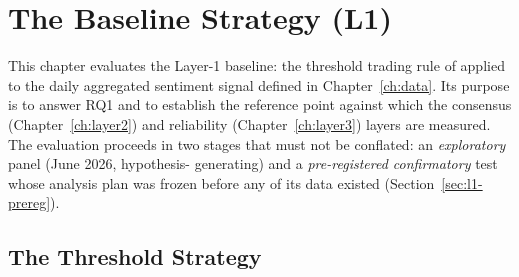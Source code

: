 %
%
%
%
\chapter{The Baseline Strategy (L1)}
\label{ch:layer1}

This chapter evaluates the Layer-1 baseline: the threshold trading rule
of \textcite{mitic2026llm} applied to the daily aggregated sentiment
signal defined in Chapter~\ref{ch:data}. Its purpose is to answer
RQ1 and to establish the reference point against which the consensus
(Chapter~\ref{ch:layer2}) and reliability (Chapter~\ref{ch:layer3})
layers are measured. The evaluation proceeds in two stages that must
not be conflated: an \emph{exploratory} panel (June 2026, hypothesis-%
generating) and a \emph{pre-registered confirmatory} test whose
analysis plan was frozen before any of its data existed
(Section~\ref{sec:l1-prereg}).

\section{The Threshold Strategy}
\label{sec:l1-strategy}

